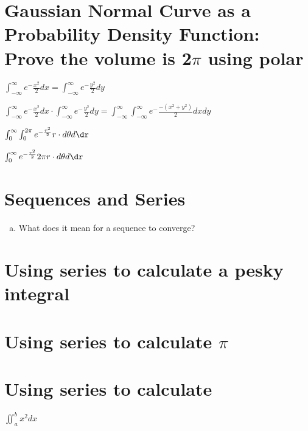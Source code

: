 \documentclass{article}
\begin{document}
\section{Gaussian Normal Curve as a Probability Density Function: Prove the volume is 2$\pi$ using polar}

    $\int_{-\infty}^{\infty} e^-\frac{x^2}{2} dx = \int_{-\infty}^{\infty} e^-\frac{y^2}{2} dy $

    $\int_{-\infty}^{\infty} e^-\frac{x^2}{2} dx \cdot \int_{-\infty}^{\infty} e^-\frac{y^2}{2} dy = \int_{-\infty}^{\infty} \int_{-\infty}^{\infty} e^-\frac{-(x^2+y^2)}{2} dx dy $

    $\int_{0}^{\infty} \int_{0}^{2\pi} e^{-\frac{r^2}{2}} r \cdot d\theta d\dr $

    $\int_{0}^{\infty} e^{-\frac{r^2}{2}} 2\pi r \cdot d\theta d\dr $

\section{Sequences and Series}

\begin{enumerate}[a.]
	\item What does it mean for a sequence to converge?

\end{enumerate}

\section{Using series to calculate a pesky integral}

\section{Using series to calculate $\pi$}

\section{Using series to calculate}

$\iint_{a}^{b} x^2 dx$
\end{document}
